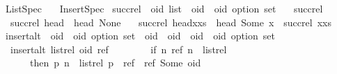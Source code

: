 %
\begin{isabellebody}%
%
%
\isadelimtheory
%
\endisadelimtheory
%
\isatagtheory
{}\isamarkupfalse%
\ List{\isacharunderscore}Spec\isanewline
\ \ \ Insert{\isacharunderscore}Spec\isanewline
{}%
\endisatagtheory
{\isafoldtheory}%
%
\isadelimtheory
\isanewline
%
\endisadelimtheory
\isanewline
{}\isamarkupfalse%
\ succ{\isacharunderscore}rel\ {\isacharcolon}{\isacharcolon}\ {\isachardoublequoteopen}{\isacharprime}oid\ list\ {\isasymRightarrow}\ {\isacharparenleft}{\isacharprime}oid\ {\isasymtimes}\ {\isacharprime}oid\ option{\isacharparenright}\ set{\isachardoublequoteclose}\ \isanewline
\ \ {\isachardoublequoteopen}succ{\isacharunderscore}rel\ {\isacharbrackleft}{\isacharbrackright}\ {\isacharequal}\ {\isacharbraceleft}{\isacharbraceright}{\isachardoublequoteclose}\ {\isacharbar}\isanewline
\ \ {\isachardoublequoteopen}succ{\isacharunderscore}rel\ {\isacharbrackleft}head{\isacharbrackright}\ {\isacharequal}\ {\isacharbraceleft}{\isacharparenleft}head{\isacharcomma}\ None{\isacharparenright}{\isacharbraceright}{\isachardoublequoteclose}\ {\isacharbar}\isanewline
\ \ {\isachardoublequoteopen}succ{\isacharunderscore}rel\ {\isacharparenleft}head{\isacharhash}x{\isacharhash}xs{\isacharparenright}\ {\isacharequal}\ {\isacharbraceleft}{\isacharparenleft}head{\isacharcomma}\ Some\ x{\isacharparenright}{\isacharbraceright}\ {\isasymunion}\ succ{\isacharunderscore}rel\ {\isacharparenleft}x{\isacharhash}xs{\isacharparenright}{\isachardoublequoteclose}\isanewline
\isanewline
{}\isamarkupfalse%
\ insert{\isacharunderscore}alt\ {\isacharcolon}{\isacharcolon}\ {\isachardoublequoteopen}{\isacharparenleft}{\isacharprime}oid\ {\isasymtimes}\ {\isacharprime}oid\ option{\isacharparenright}\ set\ {\isasymRightarrow}\ {\isacharparenleft}{\isacharprime}oid\ {\isasymtimes}\ {\isacharprime}oid{\isacharparenright}\ {\isasymRightarrow}\ {\isacharparenleft}{\isacharprime}oid\ {\isasymtimes}\ {\isacharprime}oid\ option{\isacharparenright}\ set{\isachardoublequoteclose}\ \isanewline
\ \ {\isachardoublequoteopen}insert{\isacharunderscore}alt\ list{\isacharunderscore}rel\ {\isacharparenleft}oid{\isacharcomma}\ ref{\isacharparenright}\ {\isacharequal}\ {\isacharparenleft}\isanewline
\ \ \ \ \ \ if\ {\isasymexists}n{\isachardot}\ {\isacharparenleft}ref{\isacharcomma}\ n{\isacharparenright}\ {\isasymin}\ list{\isacharunderscore}rel\isanewline
\ \ \ \ \ \ then\ {\isacharbraceleft}{\isacharparenleft}p{\isacharcomma}\ n{\isacharparenright}\ {\isasymin}\ list{\isacharunderscore}rel{\isachardot}\ p\ {\isasymnoteq}\ ref{\isacharbraceright}\ {\isasymunion}\ {\isacharbraceleft}{\isacharparenleft}ref{\isacharcomma}\ Some\ oid{\isacharparenright}{\isacharbraceright}\ {\isasymunion}\isanewline

\end{isabellebody}
